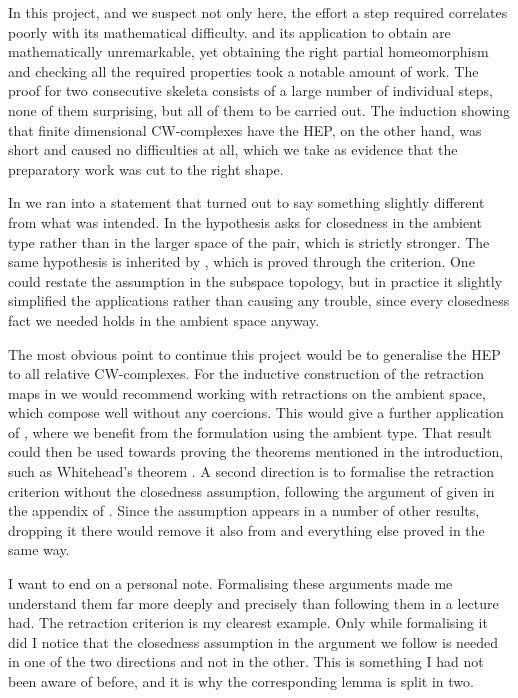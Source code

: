 \documentclass[11pt, a4paper, english]{article}
\theoremstyle{plain}
\theoremstyle{definition}
\theoremstyle{remark}
\numberwithin{equation}{section}
\numberwithin{theorem}{section}
\begin{document}
In this project, and we suspect not only here, the effort a step required correlates poorly with its mathematical difficulty.  and its application to obtain  are mathematically unremarkable, yet obtaining the right partial homeomorphism and checking all the required properties took a notable amount of work. The proof for two consecutive skeleta consists of a large number of individual steps, none of them surprising, but all of them to be carried out. The induction showing that finite dimensional CW-complexes have the HEP, on the other hand, was short and caused no difficulties at all, which we take as evidence that the preparatory work was cut to the right shape. 

In  we ran into a statement that turned out to say something slightly different from what was intended.
In  the hypothesis  asks for closedness in the ambient type rather than in the larger space of the pair, which is strictly stronger. The same hypothesis is inherited by , which is proved through the criterion. One could restate the assumption in the subspace topology, but in practice it slightly simplified the applications rather than causing any trouble, since every closedness fact we needed holds in the ambient space anyway.

The most obvious point to continue this project would be to generalise the HEP to all relative CW-complexes. For the inductive construction of the retraction maps in  we would recommend working with retractions on the ambient space, which compose well without any coercions. This would give a further application of , where we benefit from the formulation using the ambient type. That result could then be used towards proving the theorems mentioned in the introduction, such as Whitehead's theorem . A second direction is to formalise the retraction criterion without the closedness assumption, following the argument of \cite{STM} given in the appendix of \cite{HAT01}. Since the assumption appears in a number of other results, dropping it there would remove it also from  and everything else proved in the same way. 

I want to end on a personal note. Formalising these arguments made me understand them far more deeply and precisely than following them in a lecture had. The retraction criterion is my clearest example. Only while formalising it did I notice that the closedness assumption in the argument we follow is needed in one of the two directions and not in the other. This is something I had not been aware of before, and it is why the corresponding lemma is split in two.  %
\end{document}
